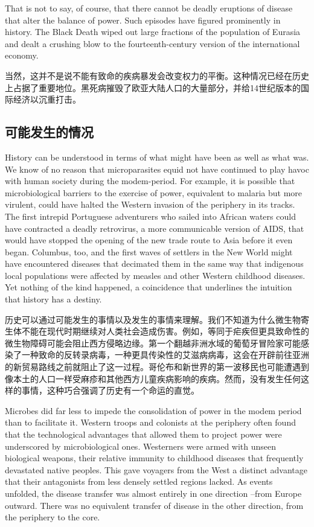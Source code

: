 \begin{Parallel}{97mm}{72mm}
  \ParallelLText
  {That is not to say, of course, that there cannot be deadly eruptions of disease that alter the balance of power. Such episodes have figured prominently in history. The Black Death wiped out large fractions of the population of Eurasia and dealt a crushing blow to the fourteenth-century version of the international economy.}
  
  \ParallelRText
  {当然，这并不是说不能有致命的疾病暴发会改变权力的平衡。这种情况已经在历史上占据了重要地位。黑死病摧毁了欧亚大陆人口的大量部分，并给14世纪版本的国际经济以沉重打击。}
  \ParallelPar

  \subsection{可能发生的情况}

  \ParallelLText
  {History can be understood in terms of what might have been as well as what was. We know of no reason that microparasites equid not have continued to play havoc with human society during the modem-period. For example, it is possible that microbiological barriers to the exercise of power, equivalent to malaria but more virulent, could have halted the Western invasion of the periphery in its tracks. The first intrepid Portuguese adventurers who sailed into African waters could have contracted a deadly retrovirus, a more communicable version of AIDS, that would have stopped the opening of the new trade route to Asia before it even began. Columbus, too, and the first waves of settlers in the New World might have encountered diseases that decimated them in the same way that indigenous local populations were affected by measles and other Western childhood diseases. Yet nothing of the kind happened, a coincidence that underlines the intuition that history has a destiny.}
  
  \ParallelRText
  {历史可以通过可能发生的事情以及发生的事情来理解。我们不知道为什么微生物寄生体不能在现代时期继续对人类社会造成伤害。例如，等同于疟疾但更具致命性的微生物障碍可能会阻止西方侵略边缘。第一个翻越非洲水域的葡萄牙冒险家可能感染了一种致命的反转录病毒，一种更具传染性的艾滋病病毒，这会在开辟前往亚洲的新贸易路线之前就阻止了这一过程。哥伦布和新世界的第一波移民也可能遭遇到像本土的人口一样受麻疹和其他西方儿童疾病影响的疾病。然而，没有发生任何这样的事情，这种巧合强调了历史有一个命运的直觉。}
  \ParallelPar


  \ParallelLText
  {Microbes did far less to impede the consolidation of power in the modem period than to facilitate it. Western troops and colonists at the periphery often found that the technological advantages that allowed them to project power were underscored by microbiological ones. Westerners were armed with unseen biological weapons, their relative immunity to childhood diseases that frequently devastated native peoples. This gave voyagers from the West a distinct advantage that their antagonists from less densely settled regions lacked. As events unfolded, the disease transfer was almost entirely in one direction --from Europe outward. There was no equivalent transfer of disease in the other direction, from the periphery to the core.}
  

\end{Parallel}
